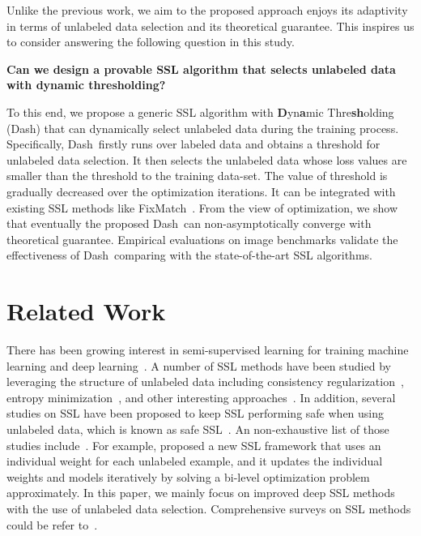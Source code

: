 \documentclass{article}
\def \Alg {Dash}
\begin{document}
Unlike the previous work, we aim to the proposed approach enjoys its adaptivity in terms of unlabeled data selection and its theoretical guarantee. This inspires us to consider answering the following question in this study. \begin{center}
    {\bf Can we design a provable SSL algorithm that selects unlabeled data with dynamic thresholding?}
\end{center}

To this end, we propose a generic SSL algorithm with {\bf D}yn{\bf a}mic Thre{\bf sh}olding (\Alg) that can dynamically select unlabeled data during the training process. Specifically, \Alg~firstly runs over labeled data and obtains a threshold for unlabeled data selection. It then selects the unlabeled data whose loss values are smaller than the threshold to the training data-set. The value of threshold is gradually decreased over the optimization iterations. It can be integrated with existing SSL methods like FixMatch~\citep{sohn2020fixmatch}. From the view of optimization, we show that eventually the proposed \Alg~can non-asymptotically converge with theoretical guarantee. Empirical evaluations on image benchmarks validate the effectiveness of \Alg~comparing with the state-of-the-art SSL algorithms. 
 
\section{Related Work}
There has been growing interest in semi-supervised learning for training machine learning and deep learning~\citep{flach2012machine,goodfellow2016deep}. A number of SSL methods have been studied by leveraging the structure of unlabeled data including consistency regularization~\citep{bachman2014learning,sajjadi2016regularization,laine2017temporal,tarvainen2017mean,miyato2018virtual,xie2020unsupervised}, entropy minimization~\citep{grandvalet2005semi,lee2013pseudo}, and other interesting approaches~\citep{berthelot2019mixmatch,berthelot2019remixmatch}. In addition, several studies on SSL have been proposed to keep SSL performing safe when using unlabeled data, which is known as safe SSL~\citep{li2014towards}. An non-exhaustive list of those studies include~\citep{cozman2003semi,singh2009unlabeled,li2011improving,balsubramani2015optimally, loog2015contrastive,li2017learning,krijthe2017projected,li2019towards,mey2019improvability,guosafe2020}. For example, \cite{ren2020not} proposed a new SSL framework that uses an individual weight for each unlabeled example, and it updates the individual weights and models iteratively by solving a bi-level optimization problem approximately. In this paper, we mainly focus on improved deep SSL methods with the use of unlabeled data selection. Comprehensive surveys on SSL methods could be refer to~\citep{zhu2005semi,chapelle2006semi,zhu2009introduction,hady2013semi,van2020survey}.
\end{document}
